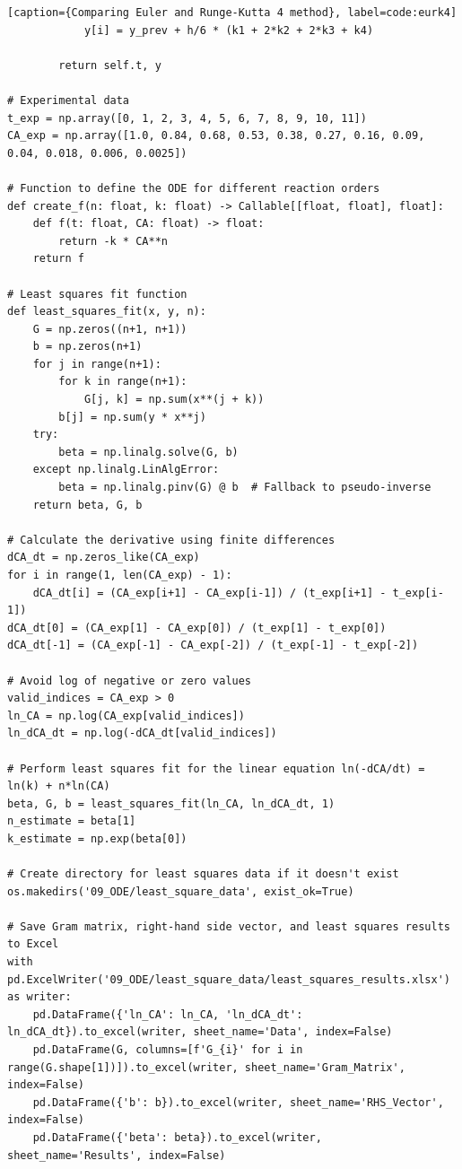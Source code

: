 \documentclass[10pt]{article}
\begin{document}
\begin{lstlisting}[style=custompython][caption={Comparing Euler and Runge-Kutta 4 method}, label=code:eurk4]
            y[i] = y_prev + h/6 * (k1 + 2*k2 + 2*k3 + k4)
            
        return self.t, y

# Experimental data
t_exp = np.array([0, 1, 2, 3, 4, 5, 6, 7, 8, 9, 10, 11])
CA_exp = np.array([1.0, 0.84, 0.68, 0.53, 0.38, 0.27, 0.16, 0.09, 0.04, 0.018, 0.006, 0.0025])

# Function to define the ODE for different reaction orders
def create_f(n: float, k: float) -> Callable[[float, float], float]:
    def f(t: float, CA: float) -> float:
        return -k * CA**n
    return f

# Least squares fit function
def least_squares_fit(x, y, n):
    G = np.zeros((n+1, n+1))
    b = np.zeros(n+1)
    for j in range(n+1):
        for k in range(n+1):
            G[j, k] = np.sum(x**(j + k))
        b[j] = np.sum(y * x**j)
    try:
        beta = np.linalg.solve(G, b)
    except np.linalg.LinAlgError:
        beta = np.linalg.pinv(G) @ b  # Fallback to pseudo-inverse
    return beta, G, b

# Calculate the derivative using finite differences
dCA_dt = np.zeros_like(CA_exp)
for i in range(1, len(CA_exp) - 1):
    dCA_dt[i] = (CA_exp[i+1] - CA_exp[i-1]) / (t_exp[i+1] - t_exp[i-1])
dCA_dt[0] = (CA_exp[1] - CA_exp[0]) / (t_exp[1] - t_exp[0])
dCA_dt[-1] = (CA_exp[-1] - CA_exp[-2]) / (t_exp[-1] - t_exp[-2])

# Avoid log of negative or zero values
valid_indices = CA_exp > 0
ln_CA = np.log(CA_exp[valid_indices])
ln_dCA_dt = np.log(-dCA_dt[valid_indices])

# Perform least squares fit for the linear equation ln(-dCA/dt) = ln(k) + n*ln(CA)
beta, G, b = least_squares_fit(ln_CA, ln_dCA_dt, 1)
n_estimate = beta[1]
k_estimate = np.exp(beta[0])

# Create directory for least squares data if it doesn't exist
os.makedirs('09_ODE/least_square_data', exist_ok=True)

# Save Gram matrix, right-hand side vector, and least squares results to Excel
with pd.ExcelWriter('09_ODE/least_square_data/least_squares_results.xlsx') as writer:
    pd.DataFrame({'ln_CA': ln_CA, 'ln_dCA_dt': ln_dCA_dt}).to_excel(writer, sheet_name='Data', index=False)
    pd.DataFrame(G, columns=[f'G_{i}' for i in range(G.shape[1])]).to_excel(writer, sheet_name='Gram_Matrix', index=False)
    pd.DataFrame({'b': b}).to_excel(writer, sheet_name='RHS_Vector', index=False)
    pd.DataFrame({'beta': beta}).to_excel(writer, sheet_name='Results', index=False)


\end{lstlisting}
\end{document}
